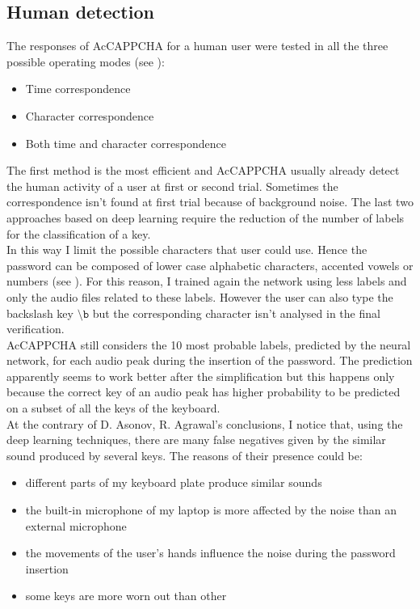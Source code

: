 \subsection{Human detection}\label{Results:human}
The responses of AcCAPPCHA for a human user were tested in all the three possible operating modes (see ): 
\begin{itemize}
\item{Time correspondence}
\item{Character correspondence}
\item{Both time and character correspondence}
\end{itemize}
The first method is the most efficient and AcCAPPCHA usually already detect the human activity of a user at first or second trial. Sometimes the correspondence isn't found at first trial because of background noise. The last two approaches based on deep learning require the reduction of the number of labels for the classification of a key.\\
In this way I limit the possible characters that user could use. Hence the password can be composed of lower case alphabetic characters, accented vowels or numbers (see ). For this reason, I trained again the network using less labels and only the audio files related to these labels. However the user can also type the backslash key $\mathtt{\setminus b}$ but the corresponding character isn't analysed in the final verification.\\
AcCAPPCHA still considers the 10 most probable labels, predicted by the neural network, for each audio peak during the insertion of the password. The prediction apparently seems to work better after the simplification but this happens only because the correct key of an audio peak has higher probability to be predicted on a subset of all the keys of the keyboard.\\
At the contrary of D. Asonov, R. Agrawal's conclusions\cite{keyboard_acoustic}, I notice that, using the deep learning techniques, there are many false negatives given by the similar sound produced by several keys. The reasons of their presence could be:
\begin{itemize}
\item{different parts of my keyboard plate produce similar sounds}
\item{the built-in microphone of my laptop is more affected by the noise than an external microphone}
\item{the movements of the user's hands influence the noise during the password insertion}
\item{some keys are more worn out than other} 
\end{itemize}
